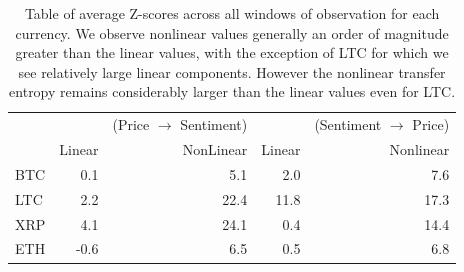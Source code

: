 \documentclass[]{rsos}%
\begin{document}
  \begin{table}[!htb]
    \label{t.table4}
    \caption{Table of average Z-scores across all windows of observation for each currency. We observe nonlinear values generally an order of magnitude greater than the linear values, with the exception of LTC for which we see relatively large linear components. However the nonlinear transfer entropy remains considerably larger than the linear values even for LTC.}
    
    \begin{tabular}{lrrrr}
      {} & {} & (Price $\rightarrow$ Sentiment) & {} & (Sentiment $\rightarrow$ Price)  \\
      {} & Linear  &  NonLinear  &  Linear  &  Nonlinear  \\
      \hline 
      BTC &     0.1 &       5.1 &       2.0 &        7.6 \\
      LTC &     2.2 &      22.4 &      11.8 &       17.3 \\
      XRP &     4.1 &      24.1 &       0.4 &       14.4 \\
      ETH &    -0.6 &       6.5 &       0.5 &        6.8 \\
      \end{tabular}
    
  \end{table}


  \pagebreak


  \vskip10pc


  


\vskip2pc


\end{document}
